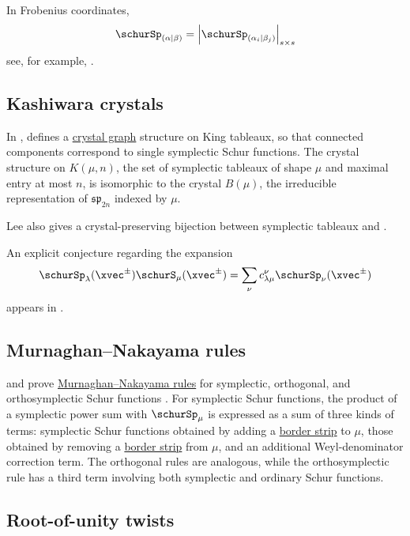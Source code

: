 In Frobenius coordinates,
\[
\schurSp_{(\alpha|\beta)} = \left| \schurSp_{(\alpha_i|\beta_j)} \right|_{s \times s}
\]
see, for example, \cite[Eq.~(3.11)]{FulmekKrattenthaler1997}.



\subsection[schurSymplecticCrystal]{Kashiwara crystals}

In \cite{Lee2019},  defines a
\hyperref[crystalGraphs]{crystal graph} structure on King tableaux,
so that connected components correspond to single symplectic Schur functions.
The crystal structure on $K(\mu,n)$, the set of symplectic tableaux of shape
$\mu$ and maximal entry at most $n$, is isomorphic to the crystal $B(\mu)$,
the irreducible representation of $\mathfrak{sp}_{2n}$ indexed by $\mu$.

Lee also gives a crystal-preserving bijection between symplectic tableaux and
\label{oscillatingTableau}.

An explicit conjecture regarding the expansion
\[
 \schurSp_\lambda(\xvec^{\pm}) \schurS_\mu(\xvec^{\pm}) = \sum_{\nu} c^{\nu}_{\lambda\mu} \schurSp_\nu(\xvec^{\pm})
\]
appears in \cite[Conj.~6.2]{Lee2019}.


\subsection[schurSymplecticMurnaghanNakayama]{Murnaghan--Nakayama rules}

 and  prove
\hyperref[murnaghanNakayamaRule]{Murnaghan--Nakayama rules} for symplectic,
orthogonal, and orthosymplectic Schur functions \cite{KumariStokke2026}.
For symplectic Schur functions, the product of a symplectic power sum with
$\schurSp_\mu$ is expressed as a sum of three kinds of terms: symplectic Schur
functions obtained by adding a \hyperref[skewShapes]{border strip} to $\mu$,
those obtained by removing a \hyperref[skewShapes]{border strip} from $\mu$,
and an additional Weyl-denominator
correction term.  The orthogonal rules are analogous, while the
orthosymplectic rule has a third term involving both symplectic and ordinary
Schur functions.


\subsection[schurMiscRootTwists]{Root-of-unity twists}

